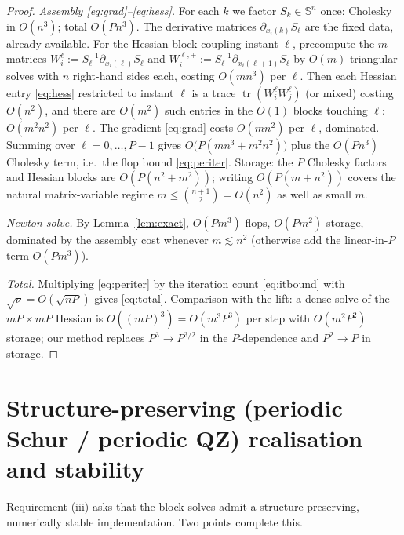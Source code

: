 \documentclass{amsart}
\newcommand{\Sym}{\mathbb{S}}
\newcommand{\tr}{\operatorname{tr}}
\begin{document}
\begin{proof}
\emph{Assembly \eqref{eq:grad}--\eqref{eq:hess}.} For each $k$ we factor
$S_k\in\Sym^n$ once: Cholesky in $O(n^3)$; total $O(Pn^3)$. The derivative matrices
$\partial_{x_i(k)}S_\ell$ are the fixed data, already available. For the Hessian
block coupling instant $\ell$, precompute the $m$ matrices
$W_i^\ell:=S_\ell^{-1}\partial_{x_i(\ell)}S_\ell$ and
$W_i^{\ell,+}:=S_\ell^{-1}\partial_{x_i(\ell+1)}S_\ell$ by $O(m)$ triangular solves
with $n$ right-hand sides each, costing $O(mn^3)$ per $\ell$. Then each Hessian
entry \eqref{eq:hess} restricted to instant $\ell$ is a trace
$\tr(W_i^\ell W_j^\ell)$ (or mixed) costing $O(n^2)$, and there are $O(m^2)$ such
entries in the $O(1)$ blocks touching $\ell$: $O(m^2n^2)$ per $\ell$. The gradient
\eqref{eq:grad} costs $O(mn^2)$ per $\ell$, dominated. Summing over
$\ell=0,\dots,P-1$ gives $O\!\big(P(mn^3+m^2n^2)\big)$ plus the $O(Pn^3)$ Cholesky
term, i.e.\ the flop bound \eqref{eq:periter}. Storage: the $P$ Cholesky factors and
Hessian blocks are $O(P(n^2+m^2))$; writing $O(P(m+n^2))$ covers the natural
matrix-variable regime $m\le\binom{n+1}{2}=O(n^2)$ as well as small $m$.

\emph{Newton solve.} By Lemma~\ref{lem:exact}, $O(Pm^3)$ flops, $O(Pm^2)$ storage,
dominated by the assembly cost whenever $m\lesssim n^2$ (otherwise add the linear-in-$P$
term $O(Pm^3)$).

\emph{Total.} Multiplying \eqref{eq:periter} by the iteration count \eqref{eq:itbound}
with $\sqrt\nu=O(\sqrt{nP})$ gives \eqref{eq:total}. Comparison with the lift: a
dense solve of the $mP\times mP$ Hessian is $O((mP)^3)=O(m^3P^3)$ per step with
$O(m^2P^2)$ storage; our method replaces $P^3\to P^{3/2}$ in the $P$-dependence and
$P^2\to P$ in storage.
\end{proof}

\section{Structure-preserving (periodic Schur / periodic QZ) realisation and stability}
\label{sec:schur}

Requirement (iii) asks that the block solves admit a structure-preserving,
numerically stable implementation. Two points complete this.
\end{document}

